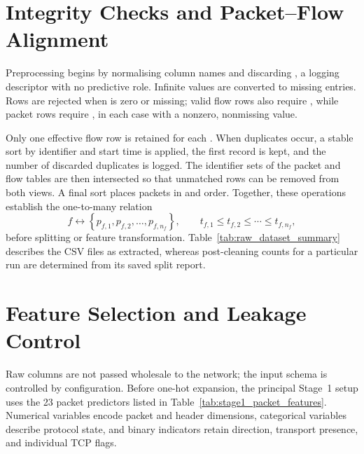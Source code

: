 \documentclass[11pt,fleqn]{report}
\begin{document}
\section{Integrity Checks and Packet--Flow Alignment}
\label{subsec:data_integrity}

Preprocessing begins by normalising column names and discarding , a logging descriptor with no predictive role. Infinite values are converted to missing entries. Rows are rejected when  is zero or missing; valid flow rows also require , while packet rows require , in each case with a nonzero, nonmissing value.

Only one effective flow row is retained for each . When duplicates occur, a stable sort by identifier and start time is applied, the first record is kept, and the number of discarded duplicates is logged. The identifier sets of the packet and flow tables are then intersected so that unmatched rows can be removed from both views. A final sort places packets in  and  order. Together, these operations establish the one-to-many relation
\begin{equation}
    f \longleftrightarrow
    \left\{p_{f,1},p_{f,2},\ldots,p_{f,n_f}\right\},
    \qquad
    t_{f,1}\leq t_{f,2}\leq\cdots\leq t_{f,n_f},
    \label{eq:packet_flow_alignment}
\end{equation}
before splitting or feature transformation. Table~\ref{tab:raw_dataset_summary} describes the CSV files as extracted, whereas post-cleaning counts for a particular run are determined from its saved split report.

\section{Feature Selection and Leakage Control}
\label{subsec:feature_selection}

Raw columns are not passed wholesale to the network; the input schema is controlled by configuration. Before one-hot expansion, the principal Stage~1 setup uses the 23 packet predictors listed in Table~\ref{tab:stage1_packet_features}. Numerical variables encode packet and header dimensions, categorical variables describe protocol state, and binary indicators retain direction, transport presence, and individual TCP flags.
\end{document}
